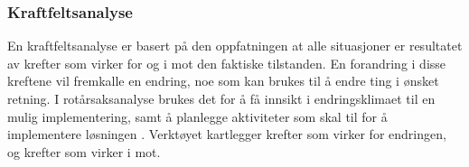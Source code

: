 \subsubsection{Kraftfeltsanalyse}
En kraftfeltsanalyse er basert på den oppfatningen at alle situasjoner er resultatet av krefter som virker for og i mot den faktiske tilstanden. En forandring i disse kreftene vil fremkalle en endring, noe som kan brukes til å endre ting i ønsket retning. I rotårsaksanalyse brukes det for å få innsikt i endringsklimaet til en mulig implementering, samt å planlegge aktiviteter som skal til for å implementere løsningen \cite{RCA}. Verktøyet kartlegger krefter som virker for endringen, og krefter som virker i mot. 